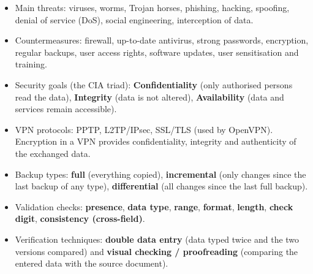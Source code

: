 \documentclass[11pt]{article}
\newcommand{\cle}[1]{{\popxbold\color{popdark}#1}}
\begin{document}
\begin{aretenir}
\begin{itemize}
  \item Main threats: viruses, worms, Trojan horses, phishing, hacking, spoofing, denial of service (DoS), social engineering, interception of data.
  \item Countermeasures: firewall, up-to-date antivirus, strong passwords, encryption, regular backups, user access rights, software updates, user sensitisation and training.
  \item Security goals (the \cle{CIA triad}): \textbf{Confidentiality} (only authorised persons read the data), \textbf{Integrity} (data is not altered), \textbf{Availability} (data and services remain accessible).
  \item VPN protocols: PPTP, L2TP/IPsec, SSL/TLS (used by OpenVPN). Encryption in a VPN provides confidentiality, integrity and authenticity of the exchanged data.
  \item Backup types: \textbf{full} (everything copied), \textbf{incremental} (only changes since the last backup of any type), \textbf{differential} (all changes since the last full backup).
  \item Validation checks: \textbf{presence}, \textbf{data type}, \textbf{range}, \textbf{format}, \textbf{length}, \textbf{check digit}, \textbf{consistency (cross-field)}.
  \item Verification techniques: \textbf{double data entry} (data typed twice and the two versions compared) and \textbf{visual checking / proofreading} (comparing the entered data with the source document).
\end{itemize}
\end{aretenir}
\end{document}
